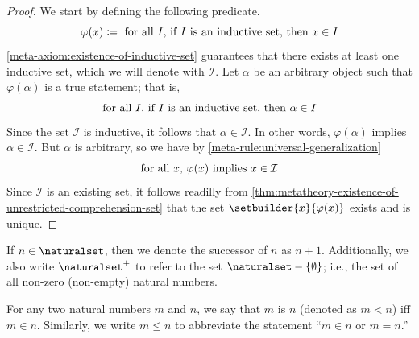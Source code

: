 \begin{proof}
    We start by defining the following predicate.
    \begin{equation*}
        \varphi(x) \coloneq \ \text{for all \( I \), if \( I \) is an inductive set, then \( x \in I \)}
    \end{equation*}
    \cref{meta-axiom:existence-of-inductive-set} guarantees that there exists at least one inductive set, which we will denote with \( \mathcal{I} \).
    Let \( \alpha \) be an arbitrary object such that \( \varphi(\alpha) \) is a true statement; that is,
    \begin{equation*}
        \text{for all \( I \), if \( I \) is an inductive set, then \( \alpha \in I \)}
    \end{equation*}
    Since the set \( \mathcal{I} \) is inductive, it follows that \( \alpha \in \mathcal{I} \).
    In other words, \( \varphi(\alpha) \) implies \( \alpha \in \mathcal{I} \).
    But \( \alpha \) is arbitrary, so we have by \cref{meta-rule:universal-generalization}
    \begin{equation*}
        \text{for all \( x \), \( \varphi(x) \) implies \( x \in \mathcal{I} \)}
    \end{equation*}
    Since \( \mathcal{I} \) is an existing set, it follows readilly from \cref{thm:metatheory-existence-of-unrestricted-comprehension-set} that the set
    \( \setbuilder{x}{\varphi(x)} \) exists and is unique.
\end{proof}


\begin{notation}
    If \( n \in \naturalset \), then we denote the successor of \( n \) as \( n + 1 \).
    Additionally, we also write \( \naturalset^{+} \) to refer to the set \( \naturalset - \mleft\{ \emptyset \mright\} \); i.e., the set of all
    non-zero (non-empty) natural numbers.
\end{notation}

\begin{dfn}
     \label{dfn:metatheory-ordering-of-natural-numbers}
    For any two natural numbers \( m \) and \( n \), we say that \( m \) is  \( n \) (denoted as \( m < n \))
    iff \( m \in n \).
    Similarly, we write \( m \leq n \) to abbreviate the statement ``\( m \in n \) or \( m = n \).''
\end{dfn}


